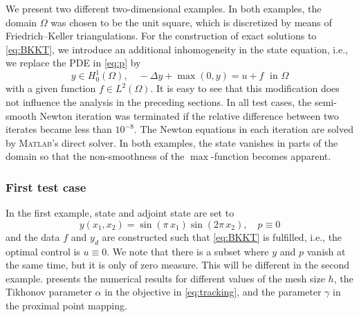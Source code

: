 \documentclass[reqno]{shinyart}
\begin{document}
We present two different two-dimensional examples. In both examples, the domain $\Omega$ 
was chosen to be the unit square, which is discretized by means of 
Friedrich--Keller triangulations. For the construction of exact solutions to \eqref{eq:BKKT}, 
we introduce an additional inhomogeneity in the state equation, i.e., we replace the PDE 
in \eqref{eq:p} by
\begin{equation*}
    y \in H_0^1(\Omega), \quad -\Delta y + \max(0, y) = u + f \; \text{ in }\Omega
\end{equation*}
with a given function $f\in L^2(\Omega)$. It is easy to see that this modification does not 
influence the analysis in the preceding sections. In all test cases, the semi-smooth Newton iteration 
was terminated if the relative difference between two iterates became less than $10^{-8}$.
The Newton equations in each iteration are solved by \textsc{Matlab}'s direct solver. 
In both examples, the state vanishes in parts of the domain so that the non-smoothness of the 
$\max$-function becomes apparent. 

\subsubsection{First test case}

In the first example, state and adjoint state are set to 
\begin{equation*}
    y(x_1, x_2) = \sin(\pi\, x_1) \sin(2\pi\, x_2), \quad 
    p \equiv 0
\end{equation*}
and the data $f$ and $y_d$ are constructed such that \eqref{eq:BKKT} is fulfilled, i.e., the optimal control is $u\equiv 0$.
We note that there is a subset where $y$ and $p$ vanish at the same time, but 
it is only of zero measure. This will be different in the second example.
 presents the numerical results for different values of the mesh size $h$,
the Tikhonov parameter $\alpha$ in the objective in \eqref{eq:tracking}, and the parameter 
$\gamma$ in the proximal point mapping.
\end{document}
